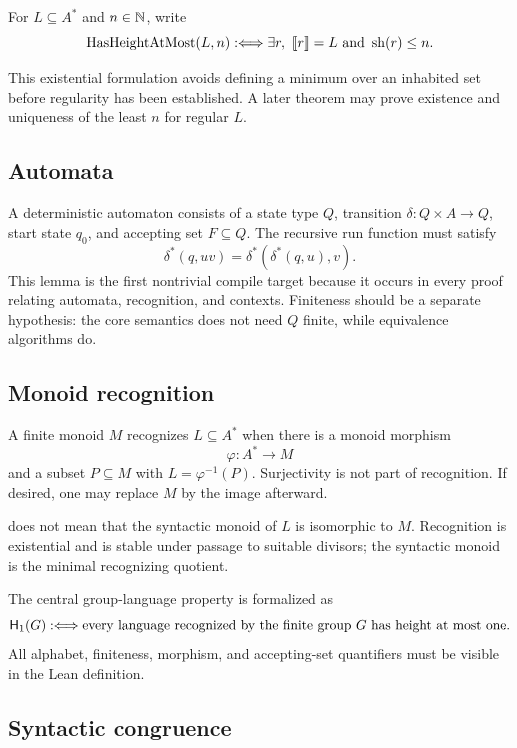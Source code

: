 \documentclass{amsart}
\begin{document}
\begin{definition}\label{def:hasheight}
For $L\subseteq A^\ast$ and $n\in\mathbb{N}$, write
\[
  \operatorname{HasHeightAtMost}(L,n)
  :\Longleftrightarrow
  \exists r,\ \llbracket r\rrbracket=L\text{ and }\operatorname{sh}(r)\leq n.
\]
\end{definition}
This existential formulation avoids defining a minimum over an inhabited set before regularity has been established.  A later theorem may prove existence and uniqueness of the least $n$ for regular $L$.

\subsection{Automata}

A deterministic automaton consists of a state type $Q$, transition $\delta:Q\times A\to Q$, start state $q_0$, and accepting set $F\subseteq Q$.  The recursive run function must satisfy
\[
  \delta^\ast(q,uv)=\delta^\ast(\delta^\ast(q,u),v).
\]
This lemma is the first nontrivial compile target because it occurs in every proof relating automata, recognition, and contexts.  Finiteness should be a separate hypothesis: the core semantics does not need $Q$ finite, while equivalence algorithms do.

\subsection{Monoid recognition}

A finite monoid $M$ recognizes $L\subseteq A^\ast$ when there is a monoid morphism
\[
  \varphi:A^\ast\longrightarrow M
\]
and a subset $P\subseteq M$ with $L=\varphi^{-1}(P)$.  Surjectivity is not part of recognition.  If desired, one may replace $M$ by the image afterward.

\begin{warning}
 does not mean that the syntactic monoid of $L$ is isomorphic to $M$.  Recognition is existential and is stable under passage to suitable divisors; the syntactic monoid is the minimal recognizing quotient.
\end{warning}

The central group-language property is formalized as
\[
\mathsf{H}_{1}(G):\Longleftrightarrow
\text{every language recognized by the finite group $G$ has height at most one}.
\]
All alphabet, finiteness, morphism, and accepting-set quantifiers must be visible in the Lean definition.

\subsection{Syntactic congruence}
\end{document}
